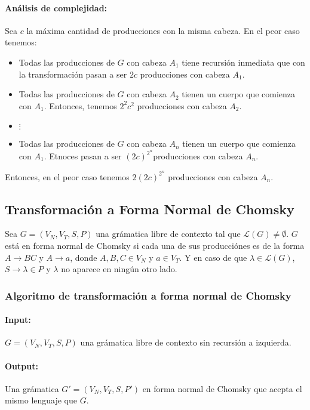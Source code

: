 \paragraph{Análisis de complejidad:} Sea \(c\) la máxima cantidad de producciones con la misma cabeza.
En el peor caso tenemos:
\begin{itemize}
  \item Todas las producciones de \(G\) con cabeza \(A_1\) tiene recursión inmediata que con la transformación pasan a ser \(2c\) producciones con cabeza \(A_1\).
  \item Todas las producciones de \(G\) con cabeza \(A_2\) tienen un cuerpo que comienza con \(A_1\). Entonces, tenemos \(2^2c^2\) producciones con cabeza \(A_2\).
  \item \(\vdots\)
  \item Todas las producciones de \(G\) con cabeza \(A_n\) tienen un cuerpo que comienza con \(A_1\). Etnoces pasan a ser \((2c)^{2^n}\)producciones con cabeza \(A_n\).
\end{itemize}
Entonces, en el peor caso tenemos \(2(2c)^{2^n}\) producciones con cabeza \(A_n\).

\subsection{Transformación a Forma Normal de Chomsky}
Sea \(G = (V_N, V_T, S, P)\) una grámatica libre de contexto tal que \(\mathcal{L}(G)\neq\emptyset\). \(G\)está en forma normal de Chomsky si cada una de sus producciónes es de la forma \(A\to BC\) y \(A\to a\), donde \(A,B,C\in V_N\) y \(a\in V_T\). Y en caso de que \(\lambda\in\mathcal{L}(G)\), \(S\to\lambda\in P\) y \(\lambda\) no aparece en ningún otro lado.

\subsubsection{Algoritmo de transformación a forma normal de Chomsky}

\paragraph{Input:} \(G = (V_N, V_T, S, P)\) una grámatica libre de contexto sin recursión a izquierda.

\paragraph{Output:} Una grámatica \(G' = (V_N, V_T, S, P')\) en forma normal de Chomsky que acepta el mismo lenguaje que \(G\).

